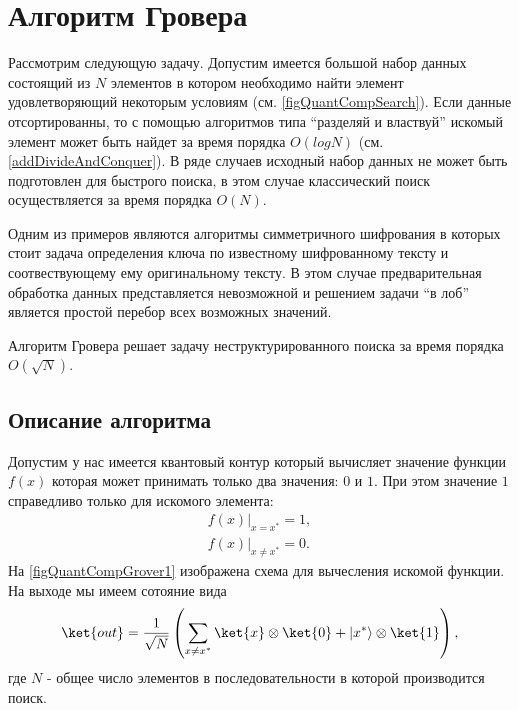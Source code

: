 \section{Алгоритм Гровера}
Рассмотрим следующую задачу. Допустим имеется большой набор данных
состоящий из $N$ элементов в котором необходимо найти элемент
удовлетворяющий некоторым условиям (см. \autoref{figQuantCompSearch}).
Если данные отсортированны, то с  
помощью алгоритмов типа ``разделяй и властвуй'' искомый элемент может
быть найдет за время порядка $O\left(log N\right)$
(см. \autoref{addDivideAndConquer}). В ряде случаев исходный набор данных
не может быть подготовлен для быстрого поиска, в этом случае
классический поиск осуществляется за время порядка $O\left(N\right)$.



Одним из примеров являются алгоритмы симметричного шифрования в
которых стоит задача определения ключа по известному шифрованному
тексту и соотвествующему ему оригинальному тексту. В этом случае
предварительная обработка данных представляется невозможной и решением
задачи ``в лоб'' является простой перебор всех возможных значений.

Алгоритм Гровера \cite{Grover96afast} решает задачу
неструктурированного поиска за время порядка $O\left(\sqrt{N}\right)$.

\subsection{Описание алгоритма}

Допустим у нас имеется квантовый контур который вычисляет значение
функции $f\left(x\right)$ которая может принимать только два значения:
$0$ и $1$. При этом значение $1$ справедливо только для искомого
элемента: 
\begin{eqnarray}
\left.f\left(x\right)\right|_{x = x^{\ast}} = 1,
\nonumber \\
\left.f\left(x\right)\right|_{x \ne x^{\ast}} = 0.
\label{eqQuantCompGroverF}
\end{eqnarray}
На \autoref{figQuantCompGrover1} изображена схема для вычесления
искомой функции. На выходе мы имеем сотояние вида
\begin{equation}
\ket{out} = \frac{1}{\sqrt{N}}\left(
 \sum_{x \ne x^{\ast}} \ket{x}\otimes\ket{0}
+ \left|x^{\ast}\right>\otimes\ket{1}
\right),
\label{eqQuantCompGroverFake}
\end{equation}
где $N$ - общее число элементов в последовательности в которой
производится поиск.

